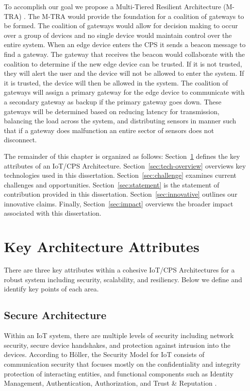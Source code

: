 \documentclass[../main.tex]{subfiles}
\begin{document}
To accomplish our goal we propose a Multi-Tiered Resilient Architecture (M-TRA) . The M-TRA would provide the foundation for a coalition of gateways to be formed. The coalition of gateways would allow for decision making to occur over a group of devices and no single device would maintain control over the entire system. When an edge device enters the CPS it sends a beacon message to find a gateway. The gateway that receives the beacon would collaborate with the coalition to determine if the new edge device can be trusted. If it is not trusted, they will alert the user and the device will not be allowed to enter the system. If it is trusted, the device will then be allowed in the system. The coalition of gateways will assign a primary gateway for the edge device to communicate with a secondary gateway as backup if the primary gateway goes down. These gateways will be determined based on reducing latency for transmission, balancing the load across the system, and distributing sensors in manner such that if a gateway does malfunction an entire sector of sensors does not disconnect. 

The remainder of this chapter is organized as follows: Section~\ref{sec:key-attributes} defines the key attributes of an IoT/CPS Architecture. Section~\ref{sec:tech-overview} overviews key technologies used in this dissertation. Section~\ref{sec:challenge} examines current challenges and opportunities. Section~\ref{sec:statement} is the statement of contribution provided in this dissertation. Section~\ref{sec:innovative} outlines our innovative claims. Finally, Section~\ref{sec:impact} overviews the broader impact associated with this dissertation.



\section{Key Architecture Attributes}
\label{sec:key-attributes}

There are three key attributes within a cohesive IoT/CPS Architectures for a robust system including security, scalability, and resiliency. Below we define and identify key points of each area. 

\subsection{Secure Architecture}
Within an IoT system, there are multiple levels of security including network security, secure device handshakes, and protection against intrusion into the devices. According to H\"oller, the Security Model for IoT consists of communication security that focuses mostly on the confidentiality and integrity protection of interacting entities, and functional components such as Identity Management, Authentication, Authorization, and Trust \& Reputation \cite{m2m_iot}.
\end{document}
